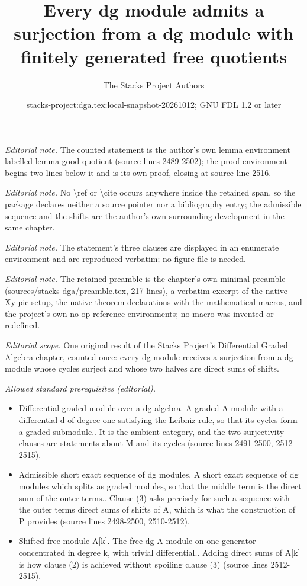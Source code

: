 \documentclass{stacks-project}
\title{Every dg module admits a surjection from a dg module with finitely generated free quotients}
\author{The Stacks Project Authors}
\date{stacks-project:dga.tex:local-snapshot-20261012; GNU FDL 1.2 or later}
\theoremstyle{plain}
\theoremstyle{definition}
\theoremstyle{remark}
\numberwithin{equation}{subsection}
\begin{document}
\maketitle
\noindent\textit{Editorial note.} The counted statement is the author's own lemma environment labelled lemma-good-quotient (source lines 2489-2502); the proof environment begins two lines below it and is its own proof, closing at source line 2516.\par\medskip
\noindent\textit{Editorial note.} No \textbackslash{}ref or \textbackslash{}cite occurs anywhere inside the retained span, so the package declares neither a source pointer nor a bibliography entry; the admissible sequence and the shifts are the author's own surrounding development in the same chapter.\par\medskip
\noindent\textit{Editorial note.} The statement's three clauses are displayed in an enumerate environment and are reproduced verbatim; no figure file is needed.\par\medskip
\noindent\textit{Editorial note.} The retained preamble is the chapter's own minimal preamble (sources/stacks-dga/preamble.tex, 217 lines), a verbatim excerpt of the native Xy-pic setup, the native theorem declarations with the mathematical macros, and the project's own no-op reference environments; no macro was invented or redefined.\par\medskip
\noindent\textit{Editorial scope.} One original result of the Stacks Project's Differential Graded Algebra chapter, counted once: every dg module receives a surjection from a dg module whose cycles surject and whose two halves are direct sums of shifts.\par\medskip
\noindent\textit{Allowed standard prerequisites (editorial).}\begin{itemize}
\item Differential graded module over a dg algebra. A graded A-module with a differential d of degree one satisfying the Leibniz rule, so that its cycles form a graded submodule.. It is the ambient category, and the two surjectivity clauses are statements about M and its cycles (source lines 2491-2500, 2512-2515).
\item Admissible short exact sequence of dg modules. A short exact sequence of dg modules which splits as graded modules, so that the middle term is the direct sum of the outer terms.. Clause (3) asks precisely for such a sequence with the outer terms direct sums of shifts of A, which is what the construction of P provides (source lines 2498-2500, 2510-2512).
\item Shifted free module A[k]. The free dg A-module on one generator concentrated in degree k, with trivial differential.. Adding direct sums of A[k] is how clause (2) is achieved without spoiling clause (3) (source lines 2512-2515).
\end{itemize}\medskip
\end{document}
